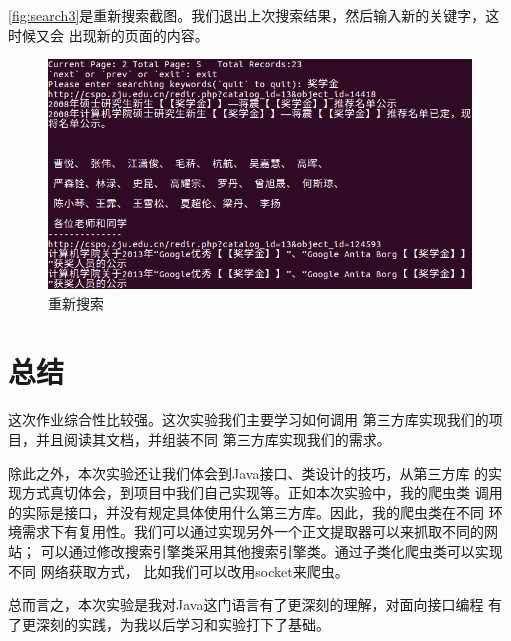 \documentclass[UTF8,a4paper,12pt]{ctexart}
\begin{document}
\autoref{fig:search3}是重新搜索截图。我们退出上次搜索结果，然后输入新的关键字，这时候又会
出现新的页面的内容。\par
\begin{figure}[htbp]
\centering
\includegraphics[scale=0.5]{pictures/3.png}
\caption{重新搜索}
\label{fig:search3}
\end{figure}
\section{总结}
这次作业综合性比较强。这次实验我们主要学习如何调用
第三方库实现我们的项目，并且阅读其文档，并组装不同
第三方库实现我们的需求。\par
除此之外，本次实验还让我们体会到Java接口、类设计的技巧，从第三方库
的实现方式真切体会，到项目中我们自己实现等。正如本次实验中，我的爬虫类
调用的实际是接口，并没有规定具体使用什么第三方库。因此，我的爬虫类在不同
环境需求下有复用性。我们可以通过实现另外一个正文提取器可以来抓取不同的网站；
可以通过修改搜索引擎类采用其他搜索引擎类。通过子类化爬虫类可以实现不同
网络获取方式， 比如我们可以改用socket来爬虫。\par
总而言之，本次实验是我对Java这门语言有了更深刻的理解，对面向接口编程
有了更深刻的实践，为我以后学习和实验打下了基础。
\end{document}
